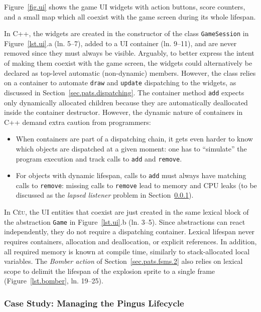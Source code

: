 \documentclass{vgtc}                          %
\newcommand{\CEU}{\textsc{C\'{e}u}\xspace}
\newcommand{\code}[1] {{\small{\texttt{#1}}}}
\begin{document}
Figure~\ref{fig.ui} shows the game UI widgets with action buttons, score
counters, and a small map which all coexist with the game screen during its
whole lifespan.

In C++, the widgets are created in the constructor of the class
\code{GameSession} in Figure~\ref{lst.ui}.a (ln. 5--7), added to a UI container
(ln. 9--11), and are never removed since they must always be visible.
Arguably, to better express the intent of making them coexist with the game
screen, the widgets could alternatively be declared as top-level automatic
(non-dynamic) members.
However, the class relies on a container to automate \code{draw} and
\code{update} dispatching to the widgets, as discussed in
Section~\ref{sec.pats.dispatching}.
The container method \code{add} expects only dynamically allocated children
because they are automatically deallocated inside the container destructor.
%
However, the dynamic nature of containers in C++ demand extra caution from
programmers:
%
\begin{itemize}
\item When containers are part of a dispatching chain, it gets even harder to
      know which objects are dispatched at a given moment:
      one has to ``simulate'' the program execution and track calls to
      \code{add} and \code{remove}.
\item For objects with dynamic lifespan, calls to \code{add} must always have
      matching calls to \code{remove}:
      missing calls to \code{remove} lead to memory and CPU leaks (to be
      discussed as the \emph{lapsed listener} problem in
      Section~\ref{sec.pats.lifespan.2}).
\end{itemize}

In \CEU, the UI entities that coexist are just created in the same lexical
block of the abstraction \code{Game} in Figure~\ref{lst.ui}.b (ln. 3--5).
%
Since abstractions can react independently, they do not require a dispatching
container.
%
Lexical lifespan never requires containers, allocation and deallocation, or
explicit references.
In addition, all required memory is known at compile time, similarly to
stack-allocated local variables.
%
The \emph{Bomber action} of Section~\ref{sec.pats.fsms.2} also relies on
lexical scope to delimit the lifespan of the explosion sprite to a single
frame (Figure~\ref{lst.bomber}, ln. 19--25).

\subsubsection{Case Study: Managing the Pingus Lifecycle}
\label{sec.pats.lifespan.2}
\end{document}
